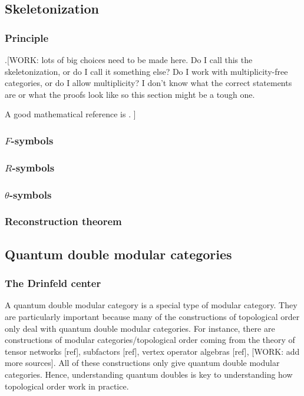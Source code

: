 \subsection{Skeletonization}

\subsubsection{Principle}

.[WORK: lots of big choices need to be made here. Do I call this the skeletonization, or do I call it something else? Do I work with multiplicity-free categories, or do I allow multiplicity? I don't know what the correct statements are or what the proofs look like so this section might be a tough one.

A good mathematical reference is \cite{davidovich2013arithmetic}.
]

\subsubsection{$F$-symbols}

\subsubsection{$R$-symbols}

\subsubsection{$\theta$-symbols}

\subsubsection{Reconstruction theorem}



\subsection{Quantum double modular categories}

\subsubsection{The Drinfeld center}

A quantum double modular category is a special type of modular category. They are particularly important because many of the constructions of topological order only deal with quantum double modular categories. For instance, there are constructions of modular categories/topological order coming from the theory of tensor networks [ref], subfactors [ref], vertex operator algebras [ref], [WORK: add more sources]. All of these constructions only give quantum double modular categories. Hence, understanding quantum doubles is key to understanding how topological order work in practice.

